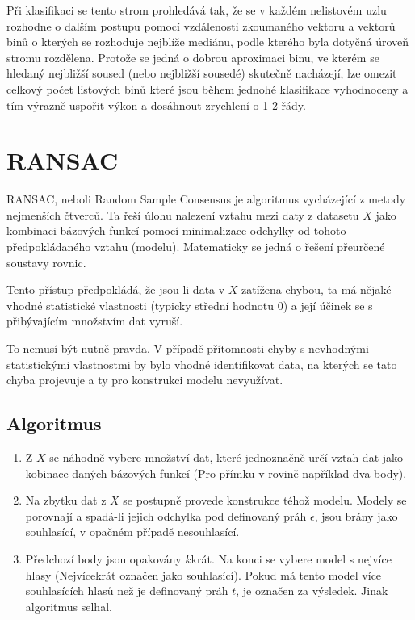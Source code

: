 	Při klasifikaci se tento strom prohledává tak, že se v každém nelistovém uzlu rozhodne o dalším postupu pomocí vzdálenosti zkoumaného vektoru a vektorů binů o kterých se rozhoduje nejblíže mediánu, podle kterého byla dotyčná úroveň stromu rozdělena. Protože se jedná o dobrou aproximaci binu, ve kterém se hledaný nejbližší soused (nebo nejbližší sousedé) skutečně nacházejí, lze omezit celkový počet listových binů které jsou během jednohé klasifikace vyhodnoceny a tím výrazně uspořit výkon a dosáhnout zrychlení o 1-2 řády.
	
	

\section{RANSAC}
\label{chap_RANSAC} 

	RANSAC, neboli Random Sample Consensus \cite{imageproc_textbook} je algoritmus vycházející z metody nejmenších čtverců. Ta řeší úlohu nalezení vztahu mezi daty z datasetu $X$ jako kombinaci bázových funkcí pomocí minimalizace odchylky od tohoto předpokládaného vztahu (modelu). Matematicky se jedná o řešení přeurčené soustavy rovnic.
	
	Tento přístup předpokládá, že jsou-li data v $X$ zatížena chybou, ta má nějaké vhodné statistické vlastnosti (typicky střední hodnotu 0) a její účinek se s přibývajícím množstvím dat vyruší.
	
	To nemusí být nutně pravda. V případě přítomnosti chyby s nevhodnými statistickými vlastnostmi by bylo vhodné identifikovat data, na kterých se tato chyba projevuje a ty pro konstrukci modelu nevyužívat.
	
	\subsection{Algoritmus}
		
	\begin{enumerate}
		\item Z $X$  se náhodně vybere množství dat, které jednoznačně určí vztah dat jako kobinace daných bázových funkcí (Pro přímku v rovině například dva body).
		\item Na zbytku dat z $X$ se postupně provede konstrukce téhož modelu. Modely se porovnají a spadá-li jejich odchylka pod definovaný práh $\epsilon$, jsou brány jako souhlasící, v opačném případě nesouhlasící.
		\item Předchozí body jsou opakovány $k$krát. Na konci se vybere model s nejvíce hlasy (Nejvícekrát označen jako souhlasící). Pokud má tento model více souhlasících hlasů než je definovaný práh $t$, je označen za výsledek. Jinak algoritmus selhal.
	\end{enumerate}
	
